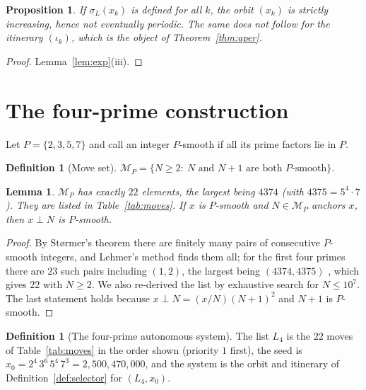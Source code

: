 \documentclass[11pt,a4paper]{article}
\newtheorem{proposition}[theorem]{Proposition}
\newtheorem{lemma}[theorem]{Lemma}
\theoremstyle{definition}
\newtheorem{definition}[theorem]{Definition}
\newcommand{\nest}{\mathbin{\perp}}
\begin{document}
\begin{proposition}\label{prop:trivial}
If $\sigma_L(x_k)$ is defined for all $k$, the orbit $(x_k)$ is strictly increasing, hence not eventually periodic. The same does \emph{not} follow for the itinerary $(\iota_k)$, which is the object of Theorem~\ref{thm:aper}.
\end{proposition}
\begin{proof}
Lemma~\ref{lem:exp}(iii).
\end{proof}

\section{The four-prime construction}\label{sec:construction}

Let $P=\{2,3,5,7\}$ and call an integer $P$-smooth if all its prime factors lie in $P$.

\begin{definition}[Move set]\label{def:moves}
$\mathcal{M}_P=\{N\ge 2:\ N \text{ and } N+1 \text{ are both } P\text{-smooth}\}$.
\end{definition}

\begin{lemma}\label{lem:moves}
$\mathcal{M}_P$ has exactly $22$ elements, the largest being $4374$ (with $4375=5^4\cdot7$). They are listed in Table~\ref{tab:moves}. If $x$ is $P$-smooth and $N\in\mathcal{M}_P$ anchors $x$, then $x\nest N$ is $P$-smooth.
\end{lemma}
\begin{proof}
By Størmer's theorem \cite{stormer} there are finitely many pairs of consecutive $P$-smooth integers, and Lehmer's method \cite{lehmer} finds them all; for the first four primes there are $23$ such pairs including $(1,2)$, the largest being $(4374,4375)$ \cite{oeis}, which gives $22$ with $N\ge2$. We also re-derived the list by exhaustive search for $N\le10^7$. The last statement holds because $x\nest N=(x/N)(N+1)^2$ and $N+1$ is $P$-smooth.
\end{proof}

\begin{definition}[The four-prime autonomous system]\label{def:system}
The list $L_4$ is the $22$ moves of Table~\ref{tab:moves} in the order shown (priority $1$ first), the seed is $x_0=2^4\,3^6\,5^4\,7^3=2{,}500{,}470{,}000$, and the system is the orbit and itinerary of Definition~\ref{def:selector} for $(L_4,x_0)$.
\end{definition}
\end{document}
